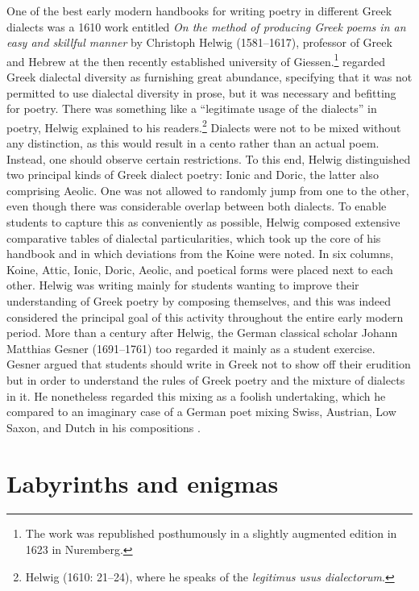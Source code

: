 One of the best early modern handbooks for writing poetry in different Greek dialects was a 1610 work entitled \textit{On the method of producing Greek poems in an easy and skillful manner} by Christoph Helwig (1581–1617), professor of Greek and Hebrew at the then recently established university of Giessen.\footnote{The work was republished posthumously in a slightly augmented edition in 1623 in Nuremberg.} \citet[19]{Helwig1610} regarded Greek dialectal diversity as furnishing great abundance, specifying that it was not permitted to use dialectal diversity in prose, but it was necessary and befitting for poetry. There was something like a “legitimate usage of the dialects” in poetry, Helwig explained to his readers.\footnote{Helwig (1610: 21–24), where he speaks of the \textit{legitimus usus dialectorum}.} Dialects were not to be mixed without any distinction, as this would result in a cento rather than an actual poem. Instead, one should observe certain restrictions. To this end, Helwig distinguished two principal kinds of Greek dialect poetry: Ionic and Doric, the latter also comprising Aeolic. One was not allowed to randomly jump from one to the other, even though there was considerable overlap between both dialects. To enable students to capture this as conveniently as possible, Helwig composed extensive comparative tables of dialectal particularities, which took up the core of his handbook and in which deviations from the Koine were noted. In six columns, Koine, Attic, Ionic, Doric, Aeolic, and poetical forms were placed next to each other. Helwig was writing mainly for students wanting to improve their understanding of Greek poetry by composing themselves, and this was indeed considered the principal goal of this activity throughout the entire early modern period. More than a century after Helwig, the German classical scholar Johann Matthias Gesner (1691–1761) too regarded it mainly as a student exercise. Gesner argued that students should write in Greek not to show off their erudition but in order to understand the rules of Greek poetry and the mixture of dialects in it. He nonetheless regarded this mixing as a foolish undertaking, which he compared to an imaginary case of a German poet mixing Swiss, Austrian, Low Saxon, and Dutch in his compositions \citep[162]{Gesner1774}.

\section{Labyrinths and enigmas}\label{sec:3.3}

